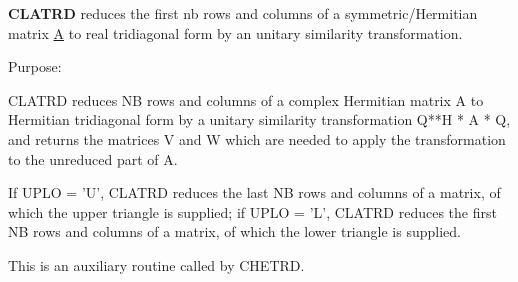 {\bfseries C\+L\+A\+T\+R\+D} reduces the first nb rows and columns of a symmetric/\+Hermitian matrix \hyperlink{classA}{A} to real tridiagonal form by an unitary similarity transformation. 

 \begin{DoxyParagraph}{Purpose\+: }
\begin{DoxyVerb} CLATRD reduces NB rows and columns of a complex Hermitian matrix A to
 Hermitian tridiagonal form by a unitary similarity
 transformation Q**H * A * Q, and returns the matrices V and W which are
 needed to apply the transformation to the unreduced part of A.

 If UPLO = 'U', CLATRD reduces the last NB rows and columns of a
 matrix, of which the upper triangle is supplied;
 if UPLO = 'L', CLATRD reduces the first NB rows and columns of a
 matrix, of which the lower triangle is supplied.

 This is an auxiliary routine called by CHETRD.\end{DoxyVerb}
 
\end{DoxyParagraph}

